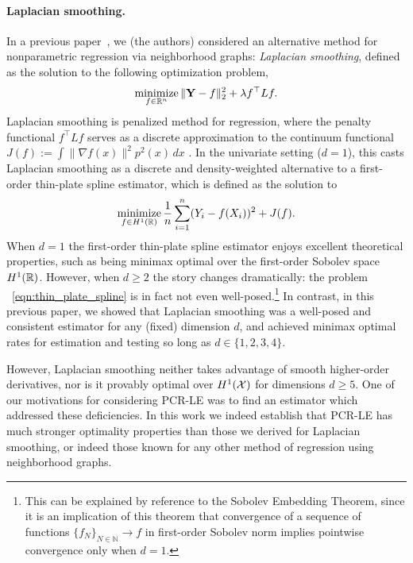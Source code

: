 \paragraph{Laplacian smoothing.}
In a previous paper~\citep{green2021}, we (the authors) considered an alternative method for nonparametric regression via neighborhood graphs: \emph{Laplacian smoothing}, defined as the solution to the following optimization problem,
\begin{equation}
\label{eqn:laplacian_smoothing}
\mathop{\mathrm{minimize}}_{f \in \mathbb{R}^n} \|{\bf Y} - f\|_2^2 + \lambda f^{\top} L f.
\end{equation}
Laplacian smoothing is penalized method for regression, where the penalty functional $f^{\top} L f$ serves as a discrete approximation to the continuum functional $J(f) := \int \|\nabla f(x)\|^2 p^2(x) \,dx$ \citep{bousquet03}. In the univariate setting ($d = 1$), this casts Laplacian smoothing as a discrete and density-weighted alternative to a first-order thin-plate spline estimator, which is defined as the solution to
\begin{equation}
\label{eqn:thin_plate_spline}
\mathop{\mathrm{minimize}}_{f \in H^1(\mathbb{R})} \frac{1}{n}\sum_{i = 1}^{n} (Y_i - f(X_i))^2 + J(f).
\end{equation}
When $d = 1$ the first-order thin-plate spline estimator enjoys excellent theoretical properties, such as being minimax optimal over the first-order Sobolev space $H^1(\mathbb{R})$. However, when $d \geq 2$ the story changes dramatically: the problem ~\eqref{eqn:thin_plate_spline} is in fact not even well-posed.\footnote{This can be explained by reference to the Sobolev Embedding Theorem, since it is an implication of this theorem that convergence of a sequence of functions $\{f_N\}_{N \in \mathbb{N}} \to f$ in first-order Sobolev norm implies pointwise convergence only when $d = 1$.} In contrast, in this previous paper, we showed that Laplacian smoothing was a well-posed and consistent estimator for any (fixed) dimension $d$, and achieved minimax optimal rates for estimation and testing so long as $d \in \{1,2,3,4\}$.

However, Laplacian smoothing neither takes advantage of smooth higher-order derivatives, nor is it provably optimal over $H^1(\mathcal{X})$ for dimensions $d \geq 5$. One of our motivations for considering PCR-LE was to find an estimator which addressed these deficiencies. In this work we indeed establish that PCR-LE has much stronger optimality properties than those we derived for Laplacian smoothing, or indeed those known for any other method of regression using neighborhood graphs. 

